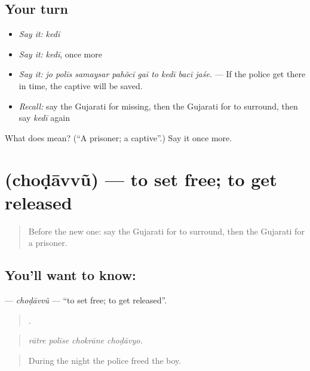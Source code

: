 \subsection*{Your turn}
\begin{itemize}
\raggedright
  \item \emph{Say it:} \emph{kedī}
  \item \emph{Say it:} \emph{kedī}, once more
  \item \emph{Say it:} \emph{jo polīs samaysar pahõcī gaī to kedī bacī jaśe.} — If the police get there in time, the captive will be saved.
  \item \emph{Recall:} say the Gujarati for missing, then the Gujarati for to surround, then say \emph{kedī} again
\end{itemize}

\begin{tcolorbox}[breakable,colback=teal!4,colframe=teal!35!black,title={Before you move on}]
What does  mean? (\textquotedblleft{}A prisoner; a captive\textquotedblright{}.) Say it once more.
\end{tcolorbox}
\section[\texorpdfstring{\gu{છોડાવવું} (choḍāvvũ)}{છોડાવવું (choḍāvvũ)}]{ (choḍāvvũ) — to set free; to get released}

\label{lesson:GU-C291-chodavvu}



\begin{quote}
Before the new one: say the Gujarati for to surround, then the Gujarati for a prisoner.
\end{quote}

\subsection*{You'll want to know: }
\textbf{} — \emph{choḍāvvũ} — \textquotedblleft{}to set free; to get released\textquotedblright{}.

\begin{quote}
   .
\end{quote}

\begin{quote}
\emph{rātre polīse chokrāne choḍāvyo.}
\end{quote}

\begin{quote}
During the night the police freed the boy.
\end{quote}

